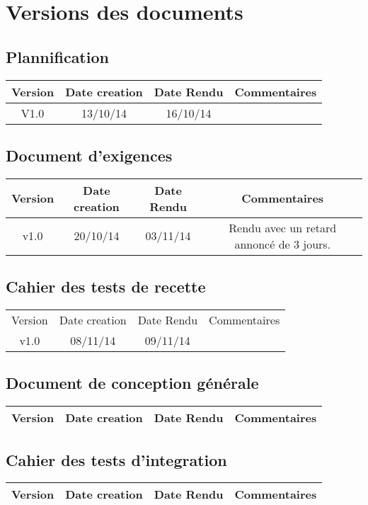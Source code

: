 \documentclass[fleqn, a4paper]{report}
\begin{document}
  \chapter*{Versions des documents}
  
  \section*{Plannification}
    \begin{tabular}{|c|c|c|c|}
      \hline
      Version & Date creation & Date Rendu & Commentaires\\
      \hline
      V1.0 & 13/10/14 & 16/10/14 & \\
      \hline
    \end{tabular}
    
   \section*{Document d'exigences}
    \begin{tabular}{|c|c|c|c|}
      \hline
      Version & Date creation & Date Rendu & Commentaires\\
      \hline
      v1.0 & 20/10/14 & 03/11/14 & Rendu avec un retard annoncé de 3 jours.
    \end{tabular}
    
   \section*{Cahier des tests de recette}
    \begin{tabular}{|c|c|c|c|}
      \hline
      Version & Date creation & Date Rendu & Commentaires\\
      v1.0 & 08/11/14 & 09/11/14 &
      \hline
    \end{tabular}  
    
   \section*{Document de conception générale}
    \begin{tabular}{|c|c|c|c|}
      \hline
      Version & Date creation & Date Rendu & Commentaires\\
      \hline
    \end{tabular}  
    
   \section*{Cahier des tests d'integration}
    \begin{tabular}{|c|c|c|c|}
      \hline
      Version & Date creation & Date Rendu & Commentaires\\
      \hline
    \end{tabular}  
    
\end{document}
